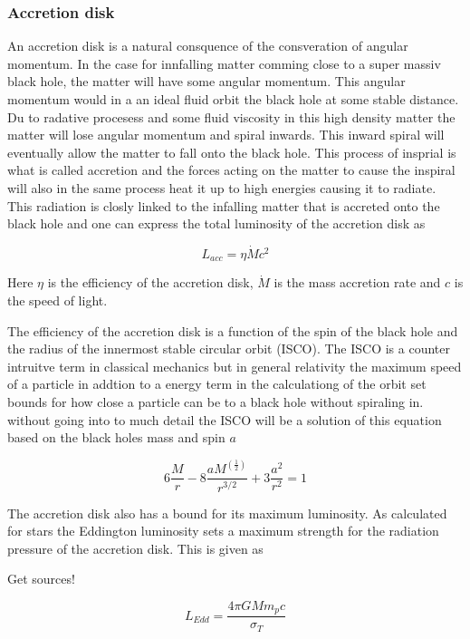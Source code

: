 \documentclass{article}
\begin{document}
\subsubsection{Accretion disk}
An accretion disk is a natural consquence of the consveration of angular momentum. In the case for innfalling 
matter comming close to a super massiv black hole, the matter will have some angular momentum. This angular momentum would in a 
an ideal fluid orbit the black hole at some stable distance. Du to radative procesess and some fluid viscosity in this high density matter
the matter will lose angular momentum and spiral inwards. This inward spiral will eventually allow the matter to fall onto the black hole. 
This process of insprial is what is called accretion and the forces acting on the matter to cause the inspiral 
will also in the same process heat it up to high energies causing it to radiate. This radiation is closly linked to the 
infalling matter that is accreted onto the black hole and one can express the total luminosity of the accretion disk as 

\begin{equation}
    L_{acc} = \eta \dot{M}c^2
\end{equation}

Here $\eta$ is the efficiency of the accretion disk, $\dot{M}$ is the mass accretion rate and $c$ is the speed of light.

The efficiency of the accretion disk is a function of the spin of the black hole and the radius of the innermost stable circular orbit (ISCO).
The ISCO is a counter intruitve term in classical mechanics but in general relativity the maximum speed of a particle 
in addtion to a energy term in the calculationg of the orbit set bounds for how close a particle can be to 
a black hole without spiraling in. without going into to much detail the ISCO will be a solution of this equation based on the black holes mass and spin $a$

\begin{equation}
    6\frac{M}{r}-8\frac{aM^(\frac{1}{2})}{r^{3/2}}+3\frac{a^2}{r^2} = 1
\end{equation}

The accretion disk also has a bound for its maximum luminosity. As calculated for stars the Eddington
luminosity sets a maximum strength for the radiation pressure of the accretion disk. This is given as

Get sources!

\begin{equation}
    L_{Edd} = \frac{4\pi G M m_p c}{\sigma_T}
\end{equation}
\end{document}

